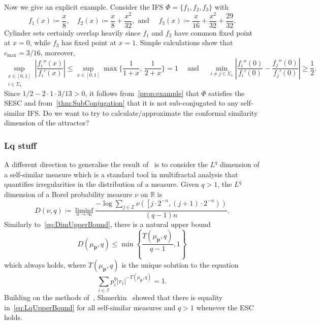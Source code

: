 \documentclass[12pt,]{article}
\def\cref#1{\ref{#1}}%
\theoremstyle{definition}
\theoremstyle{remark}
\newcommand{\0}{\mathbf{0}}
\begin{document}
{Now we give an explicit example. Consider the IFS $\Phi=\{f_1,f_2,f_3\}$ with
\begin{equation*}
f_1(x)\coloneqq \frac{x}{8}, \quad f_2(x)\coloneqq \frac{x}{8} + \frac{x^2}{32}, \text{ and } \quad
f_3(x)\coloneqq \frac{x}{16} + \frac{x^2}{32} + \frac{29}{32}. 
\end{equation*}
Cylinder sets certainly overlap heavily since $f_1$ and $f_2$ have common fixed point at $x=0$,
while $f_3$ has fixed point at $x=1$. Simple calculations show that $c_{\max}=3/16$, moreover,
\begin{equation*}
\sup_{\substack{x\in[0,1] \\ i\in\Sigma_1}} \left| \frac{f_i''(x)}{f_i'(x)} \right| \leq
\sup_{x\in[0,1]} \max\Big\{\frac{1}{1+x},\, \frac{1}{2+x} \Big\} = 1 \quad\text{ and }\quad
\min_{i\neq j\in\Sigma_1}\left| \frac{f_i''(0)}{f_i'(0)} - \frac{f_j''(0)}{f_j'(0)} \right| \geq
\frac{1}{2} .
\end{equation*}
Since $1/2-2\cdot 1\cdot 3/13>0$, it follows from~\cref{prop:example} that $\Phi$ satisfies the SESC
and from~\cref{thm:SubConjugation} that it is not sub-conjugated to any self-similar IFS.
{\color{red} Do we want to try to calculate/approximate the conformal similarity dimension of the
attractor?}

\subsubsection{Lq stuff}

A different direction to generalise the result of~\cite{Hochman_SelfSimESC_Annals} is to consider
the $L^q$ dimension of a self-similar measure which is a standard tool in multifractal analysis that
quantifies irregularities in the distribution of a measure. Given $q>1$, the $L^q$ dimension of a
Borel probability measure $\nu$ on $\mathbb{R}$ is 
\begin{equation*}
D(\nu, q)\coloneqq\liminf _{n \rightarrow \infty} \frac{-\log \sum_{j \in \mathbb{Z}}
\nu\left(\left[j \cdot 2^{-n},(j+1) \cdot 2^{-n}\right)\right)}{(q-1) n} .
\end{equation*}
Similarly to~\cref{eq:DimUpperBound}, there is a natural upper bound 
\begin{equation}\label{eq:LqUpperBound}
	D(\mu_{\mathbf{p}}, q) \leq \min \left\{\frac{T(\mu_{\mathbf{p}}, q)}{q-1} ,1\right\}
\end{equation}
which always holds, where $T(\mu_{\mathbf{p}}, q)$ is the unique solution to the equation
\begin{equation*}
	\sum_{i \in \mathcal{I}} p_i^q\left|r_i\right|^{-T(\mu_{\mathbf{p}}, q)}=1 .
\end{equation*}
Building on the methods of~\cite{Hochman_SelfSimESC_Annals},
Shmerkin~\cite{Shmerkin_LqSelfSim_Annals}  showed that there is equality in~\cref{eq:LqUpperBound}
for all self-similar measures and $q>1$ whenever the ESC holds. 


}
\end{document}
